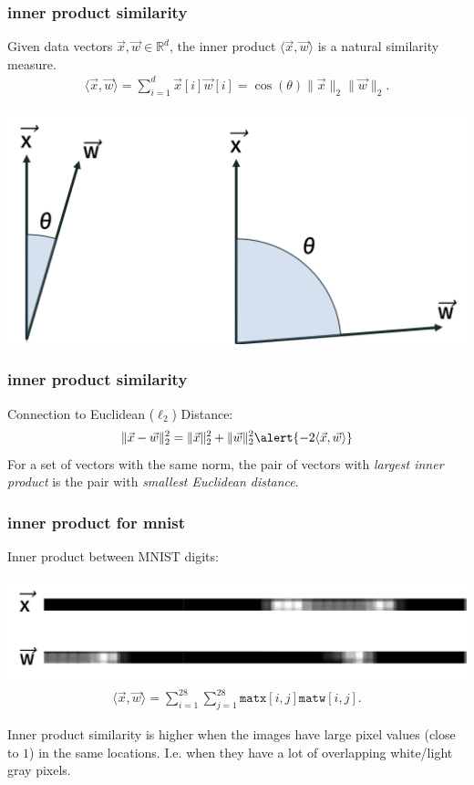 \documentclass[handout,compress]{beamer}
\newcommand{\R}{\mathbb{R}}
\begin{document}
\begin{frame}
	\frametitle{inner product similarity}
	Given data vectors $\vec{x},\vec{w}\in \R^d$, the inner product $\langle\vec{x}, \vec{w}\rangle$ is a natural similarity measure.
	\begin{align*}
	\langle\vec{x}, \vec{w}\rangle = \sum_{i=1}^d \vec{x}[i]\vec{w}[i] = \cos(\theta)\|\vec{x}\|_2\|\vec{w}\|_2.
	\end{align*}
		\begin{center}
		\includegraphics[width=.7\textwidth]{inner_product_similarity.png}
	\end{center}
\end{frame}

\begin{frame}
	\frametitle{inner product similarity}
	Connection to Euclidean ($\ell_2$) Distance:
	\begin{align*}
	\|\vec{x} - \vec{w}\|_2^2 = \|\vec{x}\|_2^2 + \|\vec{w}\|_2^2 \alert{- 2\langle\vec{x}, \vec{w}\rangle}
	\end{align*}
	For a set of vectors with the same norm, the pair of vectors with \emph{largest inner product} is the pair with \emph{smallest Euclidean distance}. 
\end{frame}

\begin{frame}
	\frametitle{inner product for mnist}
	Inner product between MNIST digits:
	\begin{center}
			\includegraphics[width=.8\textwidth]{flat_compare.png}
	\begin{align*}
	\langle \vec{x},\vec{w}\rangle = \sum_{i=1}^{28} \sum_{j=1}^{28} \texttt{matx}[i,j]\texttt{matw}[i,j].
	\end{align*}
	\end{center}
	Inner product similarity is higher when the images have large pixel values (close to $1$) in the same locations. I.e. when they have a lot of overlapping white/light gray pixels.
\end{frame}
\end{document}
